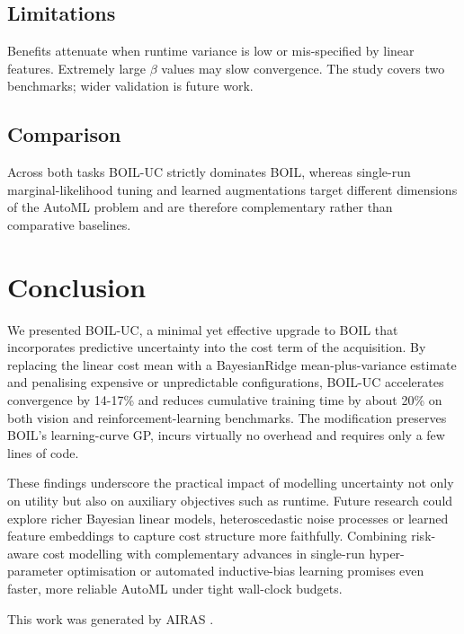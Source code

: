 \documentclass{article} %
\begin{document}
\subsection{Limitations}
Benefits attenuate when runtime variance is low or mis-specified by linear features. Extremely large $\beta$ values may slow convergence. The study covers two benchmarks; wider validation is future work.

\subsection{Comparison}
Across both tasks BOIL-UC strictly dominates BOIL, whereas single-run marginal-likelihood tuning \cite{mlodozeniec-2023-hyperparameter} and learned augmentations \cite{benton-2020-augerino} target different dimensions of the AutoML problem and are therefore complementary rather than comparative baselines.

\section{Conclusion}
\label{sec:conclusion}
We presented BOIL-UC, a minimal yet effective upgrade to BOIL that incorporates predictive uncertainty into the cost term of the acquisition. By replacing the linear cost mean with a BayesianRidge mean-plus-variance estimate and penalising expensive or unpredictable configurations, BOIL-UC accelerates convergence by 14-17\% and reduces cumulative training time by about 20\% on both vision and reinforcement-learning benchmarks. The modification preserves BOIL’s learning-curve GP, incurs virtually no overhead and requires only a few lines of code.

These findings underscore the practical impact of modelling uncertainty not only on utility but also on auxiliary objectives such as runtime. Future research could explore richer Bayesian linear models, heteroscedastic noise processes or learned feature embeddings to capture cost structure more faithfully. Combining risk-aware cost modelling with complementary advances in single-run hyper-parameter optimisation \cite{mlodozeniec-2023-hyperparameter} or automated inductive-bias learning \cite{benton-2020-augerino} promises even faster, more reliable AutoML under tight wall-clock budgets.

This work was generated by \textsc{AIRAS} \citep{airas2025}.



\end{document}
